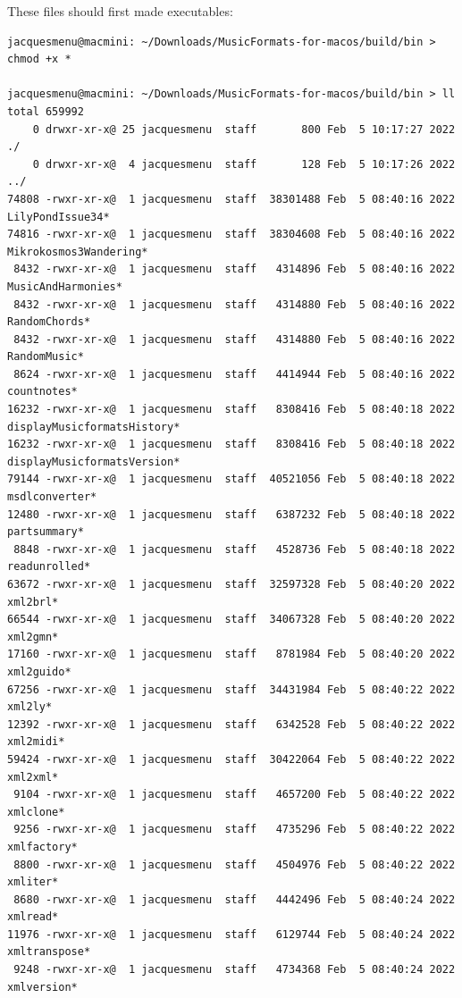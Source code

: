 These files should first made executables:
\begin{lstlisting}[language=Terminal]
jacquesmenu@macmini: ~/Downloads/MusicFormats-for-macos/build/bin > chmod +x *

jacquesmenu@macmini: ~/Downloads/MusicFormats-for-macos/build/bin > ll
total 659992
    0 drwxr-xr-x@ 25 jacquesmenu  staff       800 Feb  5 10:17:27 2022 ./
    0 drwxr-xr-x@  4 jacquesmenu  staff       128 Feb  5 10:17:26 2022 ../
74808 -rwxr-xr-x@  1 jacquesmenu  staff  38301488 Feb  5 08:40:16 2022 LilyPondIssue34*
74816 -rwxr-xr-x@  1 jacquesmenu  staff  38304608 Feb  5 08:40:16 2022 Mikrokosmos3Wandering*
 8432 -rwxr-xr-x@  1 jacquesmenu  staff   4314896 Feb  5 08:40:16 2022 MusicAndHarmonies*
 8432 -rwxr-xr-x@  1 jacquesmenu  staff   4314880 Feb  5 08:40:16 2022 RandomChords*
 8432 -rwxr-xr-x@  1 jacquesmenu  staff   4314880 Feb  5 08:40:16 2022 RandomMusic*
 8624 -rwxr-xr-x@  1 jacquesmenu  staff   4414944 Feb  5 08:40:16 2022 countnotes*
16232 -rwxr-xr-x@  1 jacquesmenu  staff   8308416 Feb  5 08:40:18 2022 displayMusicformatsHistory*
16232 -rwxr-xr-x@  1 jacquesmenu  staff   8308416 Feb  5 08:40:18 2022 displayMusicformatsVersion*
79144 -rwxr-xr-x@  1 jacquesmenu  staff  40521056 Feb  5 08:40:18 2022 msdlconverter*
12480 -rwxr-xr-x@  1 jacquesmenu  staff   6387232 Feb  5 08:40:18 2022 partsummary*
 8848 -rwxr-xr-x@  1 jacquesmenu  staff   4528736 Feb  5 08:40:18 2022 readunrolled*
63672 -rwxr-xr-x@  1 jacquesmenu  staff  32597328 Feb  5 08:40:20 2022 xml2brl*
66544 -rwxr-xr-x@  1 jacquesmenu  staff  34067328 Feb  5 08:40:20 2022 xml2gmn*
17160 -rwxr-xr-x@  1 jacquesmenu  staff   8781984 Feb  5 08:40:20 2022 xml2guido*
67256 -rwxr-xr-x@  1 jacquesmenu  staff  34431984 Feb  5 08:40:22 2022 xml2ly*
12392 -rwxr-xr-x@  1 jacquesmenu  staff   6342528 Feb  5 08:40:22 2022 xml2midi*
59424 -rwxr-xr-x@  1 jacquesmenu  staff  30422064 Feb  5 08:40:22 2022 xml2xml*
 9104 -rwxr-xr-x@  1 jacquesmenu  staff   4657200 Feb  5 08:40:22 2022 xmlclone*
 9256 -rwxr-xr-x@  1 jacquesmenu  staff   4735296 Feb  5 08:40:22 2022 xmlfactory*
 8800 -rwxr-xr-x@  1 jacquesmenu  staff   4504976 Feb  5 08:40:22 2022 xmliter*
 8680 -rwxr-xr-x@  1 jacquesmenu  staff   4442496 Feb  5 08:40:24 2022 xmlread*
11976 -rwxr-xr-x@  1 jacquesmenu  staff   6129744 Feb  5 08:40:24 2022 xmltranspose*
 9248 -rwxr-xr-x@  1 jacquesmenu  staff   4734368 Feb  5 08:40:24 2022 xmlversion*
\end{lstlisting}

